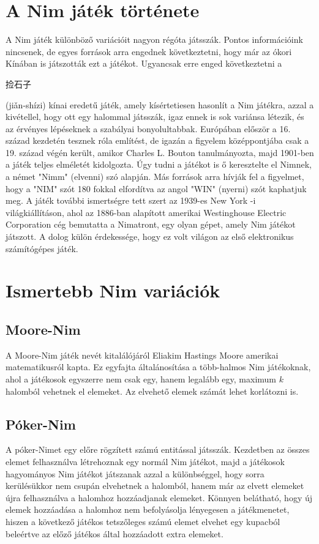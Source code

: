 \section{A Nim játék története}
A Nim játék különböző variációit nagyon régóta játsszák. Pontos információink nincsenek, de egyes források arra engednek következtetni, hogy már az ókori Kínában is játszották ezt a játékot. Ugyancsak erre enged következtetni a \begin{CJK*}{UTF8}{gbsn}捡石子\end{CJK*}
(jiǎn-shízi) kínai eredetű játék, amely kísértetiesen hasonlít a Nim játékra, azzal a kivétellel, hogy ott egy halommal játsszák, igaz ennek is sok variánsa létezik, és az érvényes lépéseknek a szabályai bonyolultabbak. \ujsor
Európában először a 16. század kezdetén tesznek róla említést, de igazán a figyelem középpontjába csak a 19. század végén került, amikor Charles L. Bouton tanulmányozta, majd 1901-ben a játék teljes elméletét kidolgozta. Úgy tudni a játékot is ő keresztelte el Nimnek, a német "Nimm" (elvenni) szó alapján. Más források arra hívják fel a figyelmet, hogy a "NIM" szót 180 fokkal elfordítva az angol "WIN" (nyerni) szót kaphatjuk meg. \ujsor
A játék további ismertségre tett szert az 1939-es New York -i világkiállításon, ahol az 1886-ban alapított amerikai Westinghouse Electric Corporation cég bemutatta a Nimatront, egy olyan gépet, amely Nim játékot játszott. A dolog külön érdekessége, hogy ez volt világon az első elektronikus számítógépes játék.

\section{Ismertebb Nim variációk}
\subsection{Moore-Nim}
A Moore-Nim játék nevét kitalálójáról Eliakim Hastings Moore amerikai matematikusról kapta. Ez egyfajta általánosítása a több-halmos Nim játékoknak, ahol a játékosok egyszerre nem csak egy, hanem legalább egy, maximum $k$ halomból vehetnek el elemeket. Az elvehető elemek számát lehet korlátozni is.

\subsection{Póker-Nim}
A póker-Nimet egy előre rögzített számú entitással játsszák. Kezdetben az összes elemet felhasználva létrehoznak egy normál Nim játékot, majd a játékosok hagyományos Nim játékot játszanak azzal a különbséggel, hogy sorra kerülésükkor nem csupán elvehetnek a halomból, hanem már az elvett elemeket újra felhasználva a halomhoz hozzáadjanak elemeket. \ujsor
Könnyen belátható, hogy új elemek hozzáadása a halomhoz nem befolyásolja lényegesen a játékmenetet, hiszen a következő játékos tetszőleges számú elemet elvehet egy kupacból beleértve az előző játékos által hozzáadott extra elemeket.

